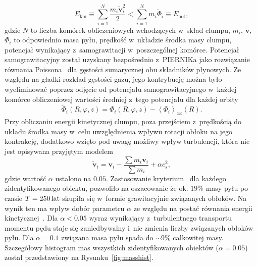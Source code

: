 \begin{equation}
   \label{eq:bcrit}
   E_{\textrm{kin}} \equiv \sum\limits_{i=1}^N \frac{m_i\tilde{\mathbf{v}}_i^2}{2} 
   < \sum\limits_{i=1}^N m_i\tilde{\Phi}_i \equiv E_{\textrm{pot}},
\end{equation}
gdzie $N$ to liczba komórek obliczeniowych wchodzących w~skład clumpu, $m_i$,
$\tilde{\mathbf{v}}$, $\Phi_i$ to odpowiednio masa pyłu, prędkość w~układzie
środka masy clumpu, potencjał wynikający z~samograwitacji w~poszczególnej
komórce. Potencjał samograwitacyjny został uzyskany bezpośrednio z~PIERNIKa jako
rozwiązanie równania Poissona~ dla gęstości sumarycznej obu
składników płynowych. Ze względu na gładki rozkład gęstości gazu, jego
kontrybucję można było wyeliminować poprzez odjęcie od potencjału
samograwitacyjnego w~każdej komórce obliczeniowej wartości średniej z~tego
potencjału dla każdej orbity
\begin{equation}
   \tilde{\Phi}_i(R,\varphi,z) = \Phi_i(R,\varphi,z) -
   \left<\Phi_i\right>_{z\varphi}(R).
\end{equation}
%
Przy obliczaniu energii kinetycznej clumpu, poza przejściem z~prędkością do układu środka
masy w~celu uwzględnienia wpływu rotacji obłoku na jego kontrakcję, dodatkowo
wzięto pod uwagę możliwy wpływ turbulencji, która nie jest opisywana przyjętym
modelem
\begin{equation}
   \label{eq:ekin}
   \tilde{\mathbf{v}}_i = \mathbf{v}_i - \frac{\sum m_i \mathbf{v}_i}{\sum m_i}
   + \alpha c_s^2,
\end{equation}
gdzie wartość $\alpha$ ustalono na $0.05$. Zastosowanie
kryterium~ dla każdego zidentyfikowanego obiektu, pozwoliło na
oszacowanie że ok. $19\%$ masy pyłu po czasie $T = 250\hbox{$\thinspace\textrm{lat}$}$ skupiła się w~formie
grawitacyjnie związanych obłoków. Na wynik ten ma wpływ dobór parametru $\alpha$
ze względu na postać równania energii kinetycznej~. Dla $\alpha <
0.05$ wyraz wynikający z~turbulentnego transportu momentu pędu staje się
zaniedbywalny i~nie zmienia liczby związanych obłoków pyłu. Dla $\alpha = 0.1$
związana masa pyłu spada do $\sim 9\%$ całkowitej masy.  Szczegółowy histogram
mas wszystkich zidentyfikowanych obiektów ($\alpha = 0.05$) został przedstawiony
na Rysunku~\ref{fig:masshist}.

